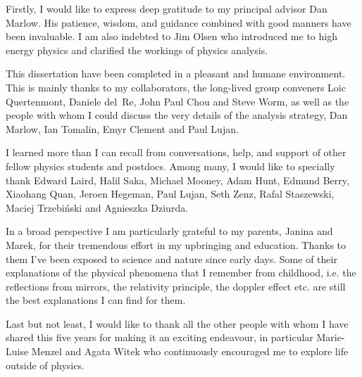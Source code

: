 
Firstly, I would like to express deep gratitude to my principal advisor Dan Marlow. His patience,
wisdom, and guidance combined with good manners have been invaluable. 
I am also indebted to Jim Olsen who introduced me to high energy physics and clarified the workings
of physics analysis.


This dissertation have been completed in a pleasant and humane environment. This is mainly
thanks to my collaborators, the
long-lived group conveners Loic Quertenmont, Daniele del~Re, John Paul Chou and Steve Worm,
as well as the people with whom I could discuss the very details of the analysis strategy,
Dan Marlow, Ian Tomalin, Emyr Clement and Paul Lujan.

I learned more than I can recall from conversations, help, and support of other fellow
physics students and postdocs. Among many, I would like to specially thank Edward Laird, Halil Saka,
Michael Mooney, Adam Hunt, Edmund Berry, Xiaohang Quan, Jeroen Hegeman, Paul Lujan, Seth Zenz,
Rafal Staszewski, Maciej Trzebi\'nski and Agnieszka Dziurda. 

In a broad perspective I am particularly grateful to my parents, Janina and Marek, for their tremendous effort in my upbringing and education.
 Thanks to them I've been exposed to science and nature since early
days. Some of their explanations of the physical phenomena that I remember from childhood,
i.e. the reflections from mirrors, the relativity principle, the doppler effect etc.
are still the best explanations I can find for them.

Last but not least, I would like to thank all the other people with whom I have shared 
this five years for making it an exciting endeavour, in particular Marie-Luise Menzel and Agata
Witek who continuously encouraged me to explore
life outside of physics.
